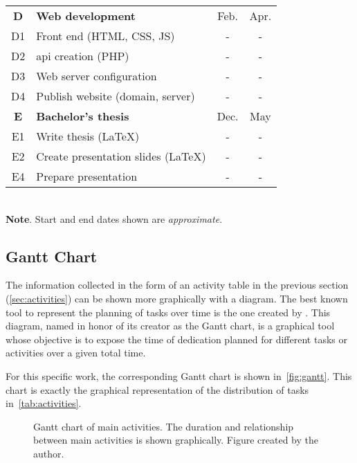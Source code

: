\begin{table}[p]
\begin{tabular}{cp{}cc}
    \textbf{D} & \textbf{Web development}         & Feb. & Apr. \\
    D1         & Front end (HTML, CSS, JS)        & -    & -    \\
    D2         & \Acs{api} creation (PHP)         & -    & -    \\
    D3         & Web server configuration         & -    & -    \\
    D4         & Publish website (domain, server) & -    & -    \\
    \midrule

    \rowcolor{rowColor}
    \textbf{E}             & \textbf{Bachelor's thesis}          & Dec. & May \\
    \rowcolor{rowColor}
    E1                     & Write thesis (\LaTeX)               & -    & -   \\
    \rowcolor{rowColor}
    E2                     & Create presentation slides (\LaTeX) & -    & -   \\
    \rowcolor{rowColor} E4 & Prepare presentation                & -    & -   \\
    \bottomrule
  \end{tabular}\\[1.25ex]
  {\small\textbf{Note}. Start and end dates shown are \emph{approximate}.}
\end{table}


\subsection{Gantt Chart}\label{sec:gantt}

The information collected in the form of an activity table in the previous
section (\vref{sec:activities}) can be shown more graphically with a
diagram. The best known tool to represent the planning of tasks over time is
the one created by . This
diagram, named in honor of its creator as the Gantt chart, is a graphical tool
whose objective is to expose the time of dedication planned for different tasks
or activities over a given total time.

For this specific work, the corresponding Gantt chart is shown in\
\vref{fig:gantt}. This chart is exactly the graphical representation of the
distribution of tasks in\ \vref{tab:activities}.

\begin{figure}[ht]
  \centering
  
  \vspace{-.6cm} %
  \caption[Gantt chart of main activities]{Gantt chart of main activities. The
    duration and relationship between main activities is shown
    graphically. Figure created by the author.}%
  \label{fig:gantt}
\end{figure}



